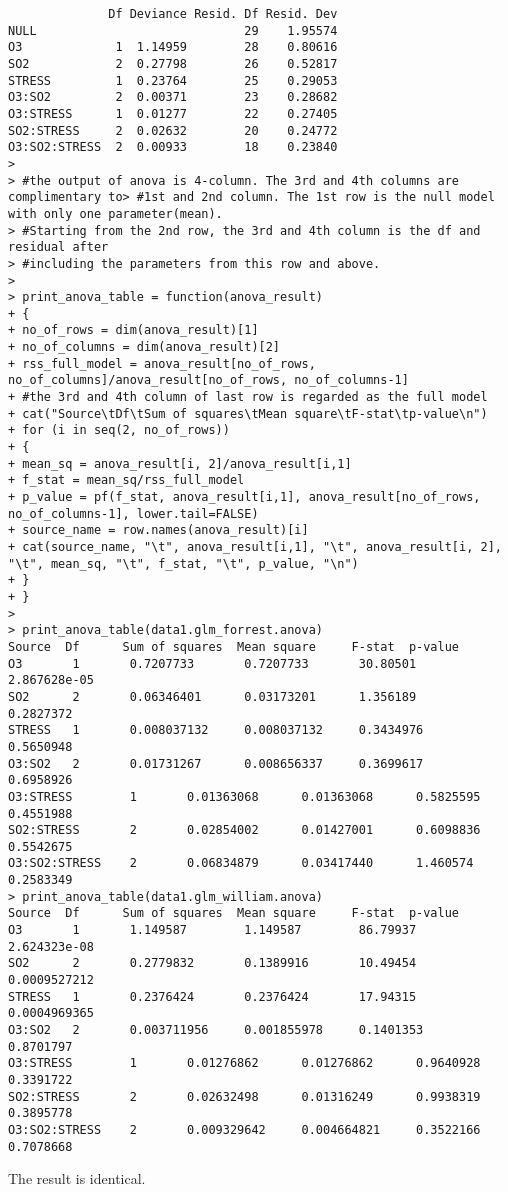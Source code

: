 \documentclass[a4paper,10pt]{article}
\begin{document}
\begin{verbatim}
              Df Deviance Resid. Df Resid. Dev
NULL                             29    1.95574
O3             1  1.14959        28    0.80616
SO2            2  0.27798        26    0.52817
STRESS         1  0.23764        25    0.29053
O3:SO2         2  0.00371        23    0.28682
O3:STRESS      1  0.01277        22    0.27405
SO2:STRESS     2  0.02632        20    0.24772
O3:SO2:STRESS  2  0.00933        18    0.23840
>
> #the output of anova is 4-column. The 3rd and 4th columns are complimentary to> #1st and 2nd column. The 1st row is the null model with only one parameter(mean).
> #Starting from the 2nd row, the 3rd and 4th column is the df and residual after
> #including the parameters from this row and above.
>
> print_anova_table = function(anova_result)
+ {
+ no_of_rows = dim(anova_result)[1]
+ no_of_columns = dim(anova_result)[2]
+ rss_full_model = anova_result[no_of_rows, no_of_columns]/anova_result[no_of_rows, no_of_columns-1]
+ #the 3rd and 4th column of last row is regarded as the full model
+ cat("Source\tDf\tSum of squares\tMean square\tF-stat\tp-value\n")
+ for (i in seq(2, no_of_rows))
+ {
+ mean_sq = anova_result[i, 2]/anova_result[i,1]
+ f_stat = mean_sq/rss_full_model
+ p_value = pf(f_stat, anova_result[i,1], anova_result[no_of_rows, no_of_columns-1], lower.tail=FALSE)
+ source_name = row.names(anova_result)[i]
+ cat(source_name, "\t", anova_result[i,1], "\t", anova_result[i, 2], "\t", mean_sq, "\t", f_stat, "\t", p_value, "\n")
+ }
+ }
>
> print_anova_table(data1.glm_forrest.anova)
Source  Df      Sum of squares  Mean square     F-stat  p-value
O3       1       0.7207733       0.7207733       30.80501        2.867628e-05
SO2      2       0.06346401      0.03173201      1.356189        0.2827372
STRESS   1       0.008037132     0.008037132     0.3434976       0.5650948
O3:SO2   2       0.01731267      0.008656337     0.3699617       0.6958926
O3:STRESS        1       0.01363068      0.01363068      0.5825595       0.4551988
SO2:STRESS       2       0.02854002      0.01427001      0.6098836       0.5542675
O3:SO2:STRESS    2       0.06834879      0.03417440      1.460574        0.2583349
> print_anova_table(data1.glm_william.anova)
Source  Df      Sum of squares  Mean square     F-stat  p-value
O3       1       1.149587        1.149587        86.79937        2.624323e-08
SO2      2       0.2779832       0.1389916       10.49454        0.0009527212
STRESS   1       0.2376424       0.2376424       17.94315        0.0004969365
O3:SO2   2       0.003711956     0.001855978     0.1401353       0.8701797
O3:STRESS        1       0.01276862      0.01276862      0.9640928       0.3391722
SO2:STRESS       2       0.02632498      0.01316249      0.9938319       0.3895778
O3:SO2:STRESS    2       0.009329642     0.004664821     0.3522166       0.7078668

\end{verbatim}
The result is identical.
\end{document}
